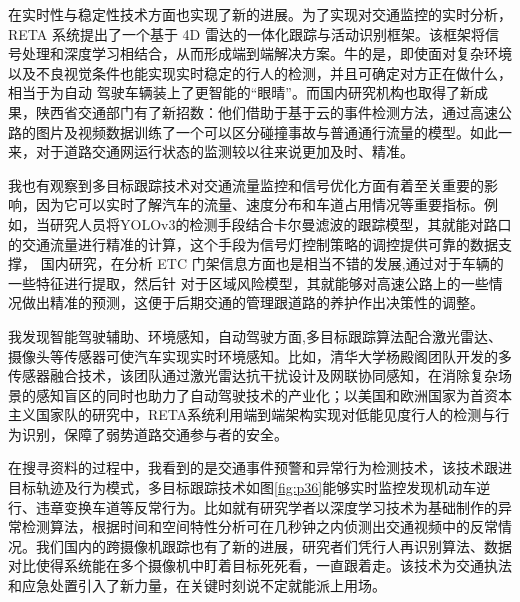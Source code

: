 在实时性与稳定性技术方面也实现了新的进展。为了实现对交通监控的实时分析，RETA 系统\cite{zhang2023reta}提出了一个基于 4D 雷达的一体化跟踪与活动识别框架。该框架将信号处理和深度学习相结合，从而形成端到端解决方案。牛的是，即使面对复杂环境以及不良视觉条件也能实现实时稳定的行人的检测，并且可确定对方正在做什么，相当于为自动 驾驶车辆装上了更智能的“眼晴”。而国内研究机构也取得了新成果，陕西省交通部门有了新招数：他们借助于基于云的事件检测方法，通过高速公路的图片及视频数据训练了一个可以区分碰撞事故与普通通行流量的模型。如此一来，对于道路交通网运行状态的监测较以往来说更加及时、精准。

我也有观察到多目标跟踪技术对交通流量监控和信号优化方面有着至关重要的影响，因为它可以实时了解汽车的流量、速度分布和车道占用情况等重要指标。例如，当研究人员将YOLOv3的检测手段结合卡尔曼滤波的跟踪模型，其就能对路口的交通流量进行精准的计算，这个手段为信号灯控制策略的调控提供可靠的数据支撑， 国内研究，在分析 ETC 门架信息方面也是相当不错的发展,通过对于车辆的一些特征进行提取，然后针 对于区域风险模型，其就能够对高速公路上的一些情况做出精准的预测，这便于后期交通的管理跟道路的养护作出决策性的调整。

我发现智能驾驶辅助、环境感知，自动驾驶方面,多目标跟踪算法配合激光雷达、摄像头等传感器可使汽车实现实时环境感知。比如，清华大学杨殿阁团队\cite{tsinghua2023环境感知}开发的多传感器融合技术，该团队通过激光雷达抗干扰设计及网联协同感知，在消除复杂场景的感知盲区的同时也助力了自动驾驶技术的产业化；以美国和欧洲国家为首资本主义国家队的研究中，RETA系统利用端到端架构实现对低能见度行人的检测与行为识别，保障了弱势道路交通参与者的安全。

在搜寻资料的过程中，我看到的是交通事件预警和异常行为检测技术，该技术跟进目标轨迹及行为模式，多目标跟踪技术如图\ref{fig:p36}能够实时监控发现机动车逆行、违章变换车道等反常行为。比如就有研究学者以深度学习技术为基础制作的异常检测算法，根据时间和空间特性分析可在几秒钟之内侦测出交通视频中的反常情况。我们国内的跨摄像机跟踪也有了新的进展，研究者们凭行人再识别算法、数据对比使得系统能在多个摄像机中盯着目标死死看，一直跟着走。该技术为交通执法和应急处置引入了新力量，在关键时刻说不定就能派上用场。
















